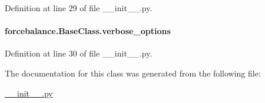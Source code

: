Definition at line 29 of file \-\_\-\-\_\-init\-\_\-\-\_\-.\-py.

\hypertarget{classforcebalance_1_1BaseClass_afd68efa29ccd2f320f4cf82198214aac}{
\paragraph[{verbose\-\_\-options}]{\setlength{\rightskip}{0pt plus 5cm}forcebalance.\-Base\-Class.\-verbose\-\_\-options}}\label{classforcebalance_1_1BaseClass_afd68efa29ccd2f320f4cf82198214aac}


Definition at line 30 of file \-\_\-\-\_\-init\-\_\-\-\_\-.\-py.



The documentation for this class was generated from the following file\-:\begin{DoxyCompactItemize}
\item 
\hyperlink{____init_____8py}{\-\_\-\-\_\-init\-\_\-\-\_\-.\-py}\end{DoxyCompactItemize}
